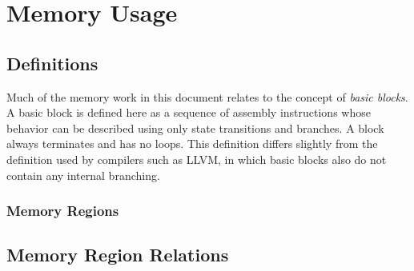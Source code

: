 \chapter{Memory Usage}

\section{Definitions}
Much of the memory work in this document relates to the concept of \emph{basic blocks}.
A basic block is defined here as a sequence of assembly instructions
whose behavior can be described using only state transitions and branches.
A block always terminates and has no loops.
This definition differs slightly from the definition used by compilers such as LLVM,
in which basic blocks also do not contain any internal branching.

\subsection{Memory Regions}\label{sse:memory_regions}

\section{Memory Region Relations}
